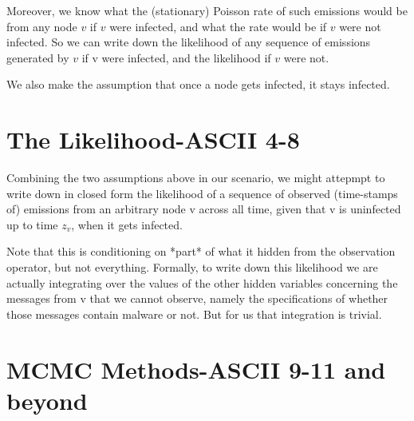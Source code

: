 \documentclass{article}
\begin{document}
	Moreover, we know what the (stationary) Poisson rate of such emissions
	would be from any node $v$ if $v$ were infected, and what the rate would
	be if $v$ were not infected. So we can write down the likelihood of any
	sequence of emissions generated by $v$ if v were infected, and the
	likelihood if $v$ were not.

	We also make the assumption that once a node gets infected, it
	stays infected.

\section{The Likelihood-ASCII 4-8}
	Combining the two assumptions above in our scenario, we might attepmpt to write down
	in closed form the likelihood of a sequence of observed (time-stamps of) emissions
	from an arbitrary node v across all time, given that v is uninfected up to
	time $z_{v}$, when it gets infected. 

	Note that this is conditioning on *part* of what it hidden from the
	observation operator, but not everything.  Formally, to write down
	this likelihood we are actually integrating over the values of the
	other hidden variables concerning the messages from v that we cannot
	observe, namely the specifications of whether those messages contain
	malware or not. But for us that integration is trivial.




\section{MCMC Methods-ASCII 9-11 and beyond}
\end{document}
